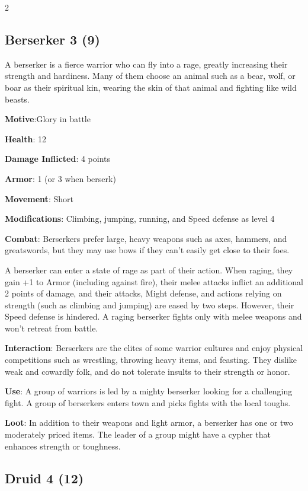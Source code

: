 \begin{multicols}{2}
\subsection{Berserker 3 (9)}

A berserker is a fierce warrior who can fly into a rage, greatly increasing their strength and hardiness. Many of them choose an animal such as a bear, wolf, or boar as their spiritual kin, wearing the skin of that animal and fighting like wild beasts. 

\textbf{Motive}:Glory in battle 

\textbf{Health}: 12 

\textbf{Damage Inflicted}: 4 points 

\textbf{Armor}: 1 (or 3 when berserk) 

\textbf{Movement}: Short 

\textbf{Modifications}: Climbing, jumping, running, and Speed defense as level 4 

\textbf{Combat}: Berserkers prefer large, heavy weapons such as axes, hammers, and greatswords, but they may use bows if they can’t easily get close to their foes. 

A berserker can enter a state of rage as part of their action. When raging, they gain +1 to Armor (including against fire), their melee attacks inflict an additional 2 points of damage, and their attacks, Might defense, and actions relying on strength (such as climbing and jumping) are eased by two steps. However, their Speed defense is hindered. A raging berserker fights only with melee weapons and won’t retreat from battle.

\textbf{Interaction}: Berserkers are the elites of some warrior cultures and enjoy physical competitions such as wrestling, throwing heavy items, and feasting. They dislike weak and cowardly folk, and do not tolerate insults to their strength or honor. 

\textbf{Use}: A group of warriors is led by a mighty berserker looking for a challenging fight. A group of berserkers enters town and picks fights with the local toughs. 

\textbf{Loot}: In addition to their weapons and light armor, a berserker has one or two moderately priced items. The leader of a group might have a cypher that enhances strength or toughness.

\subsection{Druid 4 (12)}


\end{multicols}
